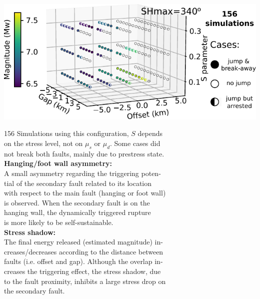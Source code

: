 \begin{poster}
{\begin{minipage}{1\linewidth}
\vskip -0cm \centering \includegraphics[width=1\linewidth]{images/tests_shmax340.pdf}
\end{minipage} 
\vskip 0.1cm
156 Simulations using this configuration, $S$ depends \\
on the stress level, not on $\mu_s$ or $\mu_d$. Some cases did \\
not break both faults, mainly due to prestress state.\\
\vskip -0.3cm
\textbf{Hanging/foot wall asymmetry:} \\
\vskip -0.3cm
A small asymmetry regarding the triggering poten-\\
tial of the secondary fault related to its location \\
with respect to the main fault (hanging or foot wall)\\
is observed. When the secondary fault is on the \\
hanging wall, the dynamically triggered rupture \\
is more likely to be self-sustainable. \\
\vskip -0.3cm
\textbf{Stress shadow:} \\
\vskip -0.3cm
The final energy released (estimated magnitude) in-\\
creases/decreases according to the distance between \\
faults (i.e. offset and gap). Although the overlap in-\\
creases the triggering effect, the stress shadow, due \\
to the fault proximity, inhibits a large stress drop on\\
the secondary fault.
}


\end{poster}
